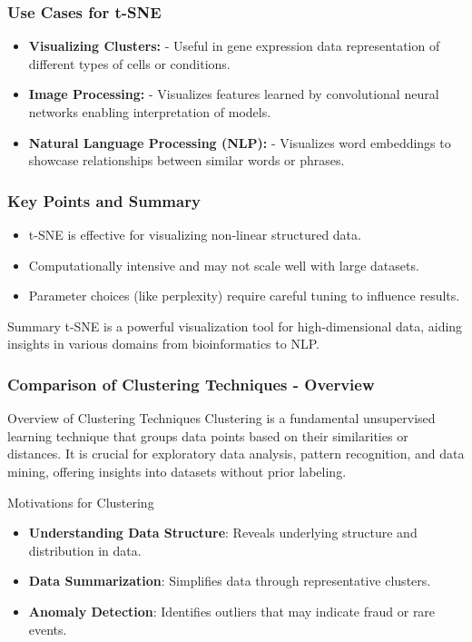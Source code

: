 \documentclass[aspectratio=169]{beamer}
\begin{document}
\begin{frame}[fragile]
    \frametitle{Use Cases for t-SNE}
    \begin{itemize}
        \item \textbf{Visualizing Clusters:} 
          - Useful in gene expression data representation of different types of cells or conditions.
        
        \item \textbf{Image Processing:} 
          - Visualizes features learned by convolutional neural networks enabling interpretation of models.

        \item \textbf{Natural Language Processing (NLP):} 
          - Visualizes word embeddings to showcase relationships between similar words or phrases.
    \end{itemize}  
\end{frame}

\begin{frame}[fragile]
    \frametitle{Key Points and Summary}
    \begin{itemize}
        \item t-SNE is effective for visualizing non-linear structured data.
        \item Computationally intensive and may not scale well with large datasets.
        \item Parameter choices (like perplexity) require careful tuning to influence results.
    \end{itemize}
    \begin{block}{Summary}
        t-SNE is a powerful visualization tool for high-dimensional data, aiding insights in various domains from bioinformatics to NLP.
    \end{block}
\end{frame}

\begin{frame}[fragile]
    \frametitle{Comparison of Clustering Techniques - Overview}
    \begin{block}{Overview of Clustering Techniques}
        Clustering is a fundamental unsupervised learning technique that groups data points based on their similarities or distances. 
        It is crucial for exploratory data analysis, pattern recognition, and data mining, offering insights into datasets without prior labeling.
    \end{block}
    
    \begin{block}{Motivations for Clustering}
        \begin{itemize}
            \item \textbf{Understanding Data Structure}: Reveals underlying structure and distribution in data.
            \item \textbf{Data Summarization}: Simplifies data through representative clusters.
            \item \textbf{Anomaly Detection}: Identifies outliers that may indicate fraud or rare events.
        \end{itemize}
    \end{block}
\end{frame}
\end{document}
